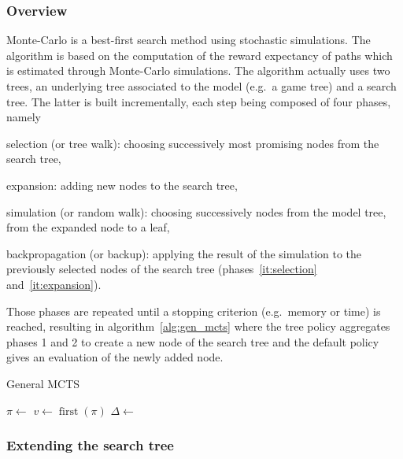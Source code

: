 \documentclass[oneside,twocolumn]{article}
\DeclareMathOperator{\first}{first}
\begin{document}
\subsubsection{Overview}\label{sssec:overview}
Monte-Carlo is a best-first search method using stochastic simulations. The
algorithm is based on the computation of the reward expectancy of paths which
is estimated through Monte-Carlo simulations.
The
algorithm actually uses two trees, an underlying tree associated to the model
(e.g.\ a game tree) and a search tree. The latter is built incrementally, each
step being composed of four phases, namely
\begin{compactenum}
\item\label{it:selection} selection (or tree walk): choosing successively
  most promising nodes from the search tree,
\item\label{it:expansion} expansion: adding new nodes to the search tree,
\item simulation (or random walk): choosing successively nodes from the model
  tree, from the expanded node to a leaf,
\item backpropagation (or backup): applying the result of the simulation to
  the previously selected nodes of the search tree (phases~\ref{it:selection}
  and~\ref{it:expansion}).
\end{compactenum}
Those phases are repeated until a stopping criterion (e.g.\ memory or time) is
reached, resulting in algorithm~\ref{alg:gen_mcts} where the tree policy
aggregates phases 1 and 2 to create a new node of the search tree and the
default policy gives an evaluation of the newly added node.
\begin{algorithm}
  \caption{General MCTS~\cite{browne2012survey}}\label{alg:gen_mcts}
  \begin{algorithmic}
    \State{}\(\pi \gets\) 
    \State{}\(v \gets \first(\pi)\)
    \State{}\(\Delta \gets\) 
    \State{}
    \EndWhile{}
    \EndProcedure{}
  \end{algorithmic}
\end{algorithm}

\subsubsection{Extending the search tree}
\end{document}
